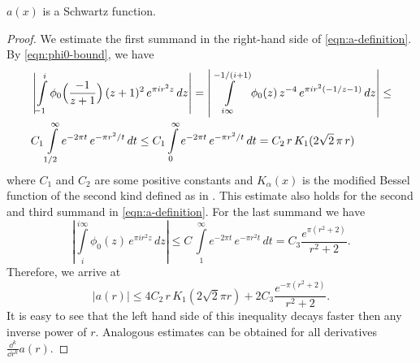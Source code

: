 \begin{proposition}\label{prop:a-schwartz}\leanok
{}
$a(x)$ is a Schwartz function.
\end{proposition}
\begin{proof}
We estimate the first summand in the right-hand side of \eqref{eqn:a-definition}.
By \eqref{eqn:phi0-bound}, we have
\begin{align}
    &\left|\int\limits_{-1}^{i}\phi_0\Big(\frac{-1}{z+1}\Big)\,(z+1)^2\,e^{\pi i r^2 z}\,dz\right|=\left|\int\limits_{i\infty}^{-1/(i+1)}\phi_0(z)\,z^{-4}\,e^{\pi i r^2 (-1/z-1)}\,dz\right|\leq \notag\\
    &C_1\int\limits_{1/2}^{\infty}e^{-2\pi t}\,e^{-\pi    r^2/t}\,dt\leq C_1\int\limits_{0}^{\infty}e^{-2\pi t}\,e^{-\pi    r^2/t}\,dt=C_2\,r\,K_1(2\sqrt{2}\,\pi\,r)\notag
\end{align}
where $C_1$ and $C_2$ are some positive constants and $K_\alpha(x)$ is the modified Bessel function of the second kind defined as in \cite[Section~9.6]{Abramowitz}. This estimate also holds for the second and third summand in \eqref{eqn:a-definition}.
For the last summand we have
\begin{equation}
\left|\int\limits_{i}^{i\infty}\phi_0(z)\,e^{\pi i r^2 z}\,dz\right|\leq C\,\int\limits_{1}^{\infty} e^{-2\pi t}\,e^{-\pi r^2 t}\,dt=C_3\frac{e^{\pi(r^2+2)}}{r^2+2}.
\end{equation}
Therefore, we arrive at
\begin{equation}
    |a(r)|\leq 4C_2\,r\,K_1(2\sqrt{2}\pi r)+2C_3\frac{e^{-\pi(r^2+2)}}{r^2+2}.
\end{equation}
It is easy to see that the left hand side of this inequality decays faster then any inverse power of $r$. Analogous estimates can be obtained for all derivatives $\frac{\dd^k}{\dd r^k}a(r)$.
\end{proof}

